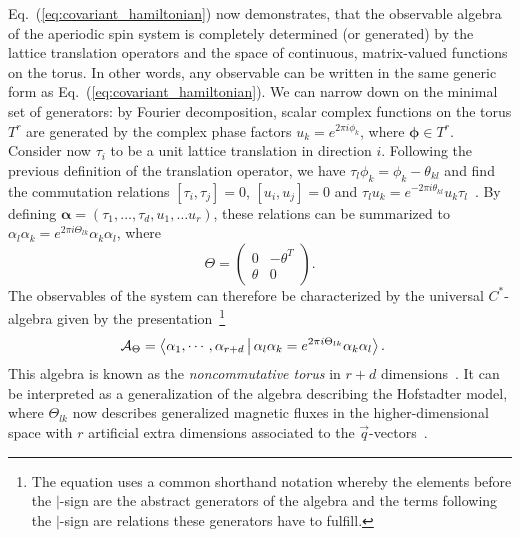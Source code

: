 \documentclass[
    10pt,
    aps,
    prl,
    twocolumn,
    floatfix,
    superscriptaddress
]{revtex4-2}
\newcommand{\SupplementalMaterial}{\cite{Note1}}
\newcommand{\revise}[1]{{#1}}
\begin{document}
Eq.~(\ref{eq:covariant_hamiltonian}) now demonstrates, that the observable algebra of the aperiodic spin system is completely determined \revise{(or generated)} by the lattice translation operators and the space of continuous, matrix-valued functions on the torus.
\revise{In other words, any observable can be written in the same generic form as Eq.~(\ref{eq:covariant_hamiltonian}).
We can narrow down on the minimal set of generators: 
by Fourier decomposition, scalar complex functions on the torus $T^r$ are generated by the complex phase factors $u_k = e^{ 2 \pi i \phi_k}$, where $\boldsymbol{\phi} \in T^r $.
Consider now $\tau_i$ to be a unit lattice translation in direction $i$. 
Following the previous definition of the translation operator, we have $ \tau_l \phi_k = \phi_k - \theta_{kl}$  and find}
the commutation relations $ [\tau_i, \tau_j] = 0 $, $ [u_i, u_j]  = 0$ and $\tau_l u_k = e^{-2 \pi i \theta_{kl}} u_k  \tau_l$~\SupplementalMaterial.
By defining $\boldsymbol{\alpha}=(\tau_1, \ldots, \tau_d, u_1,\ldots u_r )$, these relations can be summarized to $\alpha_l \alpha_k = e^{2 \pi i \Theta_{lk}} \alpha_k  \alpha_l$, where
\begin{equation}
    \Theta = \begin{pmatrix}
    0 & -\theta^T \\
    \theta & 0
    \end{pmatrix} .
\end{equation}
The observables of the system can therefore be characterized by the universal $C^\ast$-algebra given by the presentation~\footnote{\revise{The equation uses a common shorthand notation whereby the elements before the $|$-sign are the abstract generators of the algebra and the terms following the $|$-sign are relations these generators have to fulfill.}}
\begin{align}
    \mathcal{A}_\Theta &= \Braket{ \alpha_1, \cdots, \alpha_{r+d}
    |  \alpha_l \alpha_k = e^{ 2 \pi i \Theta_{lk}} \alpha_k  \alpha_l }.
\end{align}
This algebra is known as the \emph{noncommutative torus} in $r+d$ dimensions~\cite{Rieffel1981, Connes1994, Prodan2019}.
\revise{It can be interpreted as a generalization of the algebra describing the Hofstadter model, where $\Theta_{lk}$ now describes generalized magnetic fluxes in the higher-dimensional space with $r$ artificial extra dimensions associated to the $\vec{q}$-vectors~\cite{Kraus2013, Ma2021}}.
\end{document}
